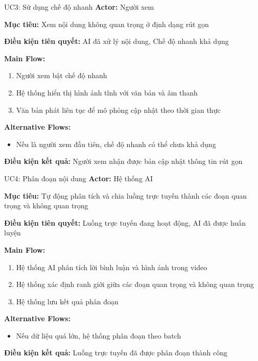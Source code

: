 \documentclass[12pt,a4paper]{article}
\newcommand{\usecasefield}[2]{%
    \textbf{#1:} #2 \par\vspace{2pt}
}
\newenvironment{mainflow}{
    \par\vspace{4pt}
    \textbf{Main Flow:}
    \begin{enumerate}[leftmargin=*, label=\arabic*., itemsep=2pt]
}{
    \end{enumerate}
}
\newenvironment{altflow}{
    \par\vspace{4pt}
    \textbf{Alternative Flows:}
    \begin{itemize}[leftmargin=*, label=\textendash, itemsep=2pt]
}{
    \end{itemize}
}
\begin{document}
\begin{usecase}{UC3: Sử dụng chế độ nhanh}
    \usecasefield{Actor}{Người xem}
    \usecasefield{Mục tiêu}{Xem nội dung không quan trọng ở định dạng rút gọn}
    \usecasefield{Điều kiện tiên quyết}{AI đã xử lý nội dung, Chế độ nhanh khả dụng}
    \begin{mainflow}
        \item Người xem bật chế độ nhanh
        \item Hệ thống hiển thị hình ảnh tĩnh với văn bản và âm thanh
        \item Văn bản phát liên tục để mô phỏng cập nhật theo thời gian thực
    \end{mainflow}
    \begin{altflow}
        \item Nếu là người xem đầu tiên, chế độ nhanh có thể chưa khả dụng
    \end{altflow}
    \usecasefield{Điều kiện kết quả}{Người xem nhận được bản cập nhật thông tin rút gọn}
\end{usecase}

\begin{usecase}{UC4: Phân đoạn nội dung}
    \usecasefield{Actor}{Hệ thống AI}
    \usecasefield{Mục tiêu}{Tự động phân tích và chia luồng trực tuyến thành các đoạn quan trọng và không quan trọng}
    \usecasefield{Điều kiện tiên quyết}{Luồng trực tuyến đang hoạt động, AI đã được huấn luyện}
    \begin{mainflow}
        \item Hệ thống AI phân tích lời bình luận và hình ảnh trong video
        \item Hệ thống xác định ranh giới giữa các đoạn quan trọng và không quan trọng
        \item Hệ thống lưu kết quả phân đoạn
    \end{mainflow}
    \begin{altflow}
        \item Nếu dữ liệu quá lớn, hệ thống phân đoạn theo batch
    \end{altflow}
    \usecasefield{Điều kiện kết quả}{Luồng trực tuyến đã được phân đoạn thành công}
\end{usecase}
\end{document}
